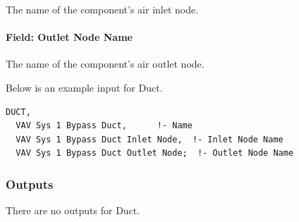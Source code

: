 The name of the component's air inlet node.

\paragraph{Field: Outlet Node Name}\label{field-outlet-node-name-2-000}

The name of the component's air outlet node.

Below is an example input for Duct.

\begin{lstlisting}
DUCT,
  VAV Sys 1 Bypass Duct,      !- Name
  VAV Sys 1 Bypass Duct Inlet Node,  !- Inlet Node Name
  VAV Sys 1 Bypass Duct Outlet Node;  !- Outlet Node Name
\end{lstlisting}

\subsubsection{Outputs}\label{outputs-10-004}

There are no outputs for Duct.